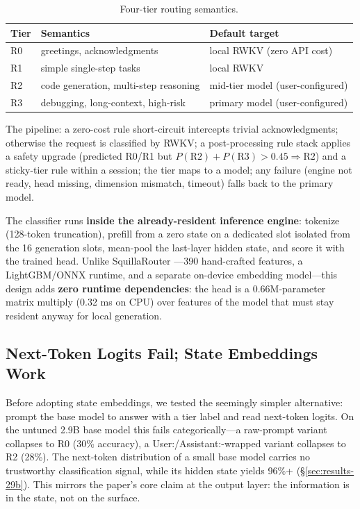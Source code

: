 \documentclass[11pt]{article}
\begin{document}
\begin{table}[h]
\centering
\begin{tabular}{lll}
\toprule
Tier & Semantics & Default target \\
\midrule
R0 & greetings, acknowledgments & local RWKV (zero API cost) \\
R1 & simple single-step tasks & local RWKV \\
R2 & code generation, multi-step reasoning & mid-tier model (user-configured) \\
R3 & debugging, long-context, high-risk & primary model (user-configured) \\
\bottomrule
\end{tabular}
\caption{Four-tier routing semantics.}
\end{table}

The pipeline: a zero-cost rule short-circuit intercepts trivial
acknowledgments; otherwise the request is classified by RWKV; a
post-processing rule stack applies a safety upgrade (predicted R0/R1 but
$P(\text{R2}) + P(\text{R3}) > 0.45 \Rightarrow \text{R2}$) and a
sticky-tier rule within a session; the tier maps to a model; any failure
(engine not ready, head missing, dimension mismatch, timeout) falls back to
the primary model.

The classifier runs \textbf{inside the already-resident inference engine}:
tokenize (128-token truncation), prefill from a zero state on a dedicated
slot isolated from the 16 generation slots, mean-pool the last-layer hidden
state, and score it with the trained head. Unlike SquillaRouter
\cite{squillarouter}---390 hand-crafted features, a LightGBM/ONNX runtime,
and a separate on-device embedding model---this design adds \textbf{zero
runtime dependencies}: the head is a 0.66M-parameter matrix multiply (0.32
ms on CPU) over features of the model that must stay resident anyway for
local generation.

\subsection{Next-Token Logits Fail; State Embeddings Work}
\label{sec:logits-fail}

Before adopting state embeddings, we tested the seemingly simpler
alternative: prompt the base model to answer with a tier label and read
next-token logits. On the untuned 2.9B base model this fails
categorically---a raw-prompt variant collapses to R0 (30\% accuracy), a
User:/Assistant:-wrapped variant collapses to R2 (28\%). The next-token
distribution of a small base model carries no trustworthy classification
signal, while its hidden state yields 96\%+
(\S\ref{sec:results-29b}). This mirrors the paper's core claim at the
output layer: the information is in the state, not on the surface.
\end{document}

